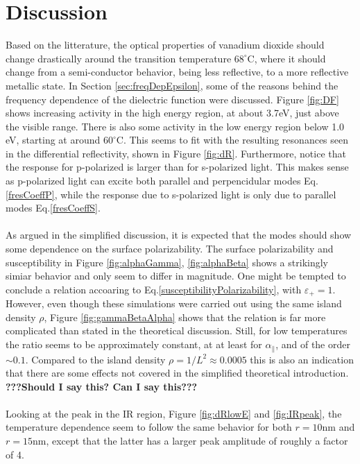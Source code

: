 \section{\textbf{Discussion}}
Based on the litterature, the optical properties of vanadium dioxide should change drastically 
around the transition temperature $68^{\circ}$C, where it should change from a semi-conductor behavior,
being less reflective, to a more reflective metallic state.
In Section \ref{sec:freqDepEpsilon}, some of the reasons behind the frequency dependence of the
dielectric function were discussed. Figure \ref{fig:DF} shows increasing activity in the high energy region,
at about 3.7eV, just above the visible range. There is also some activity in the low energy region below 
1.0 eV, starting at around $60^{\circ}$C. This seems to fit with the resulting resonances seen in the 
differential reflectivity, shown in Figure \ref{fig:dR}.
Furthermore, notice that the response for p-polarized is larger than for s-polarized light. 
This makes sense as p-polarized light can excite both parallel and perpencidular modes Eq.\eqref{fresCoeffP},
while the response due to s-polarized light is only due to parallel modes Eq.\eqref{fresCoeffS}.
\\
\\
As argued in the simplified discussion, it is expected that the modes should show some dependence 
on the surface polarizability. The surface polarizability and susceptibility in Figure 
\ref{fig:alphaGamma}, \ref{fig:alphaBeta} shows a strikingly simiar behavior and only seem to differ 
in magnitude. One might be tempted to conclude a relation accoaring to 
Eq.\eqref{susceptibilityPolarizability}, with $\varepsilon_+ = 1$. 
However, even though these simulations were carried out using the same island density $\rho$,
Figure \ref{fig:gammaBetaAlpha} shows that the relation is far more complicated than stated in
the theoretical discussion. Still, for low temperatures the ratio seems to be approximately constant, at
at least for $\alpha_{\parallel}$, and of the order $\sim 0.1$.
Compared to the island density $\rho = 1/L^2 \approx 0.0005$ this is also an indication that
there are some effects not covered in the simplified theoretical introduction.
\textbf{???Should I say this? Can I say this???}
\\
\\
Looking at the peak in the IR region, Figure \ref{fig:dRlowE} and \ref{fig:IRpeak}, the temperature
dependence seem to follow the same behavior for both $r=10$nm and $r=15$nm, except that the 
latter has a larger peak amplitude of roughly a factor of 4.





